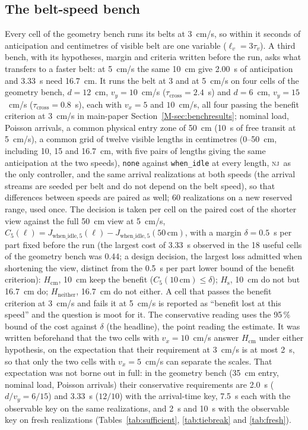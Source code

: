 \documentclass[11pt,a4paper]{article}
\newcommand{\nj}{\textsc{nj}}
\newcommand{\tcross}{\tau_{\mathrm{cross}}}
\newcommand{\tv}{\tau_{v}}
\newcommand{\lv}{\ell_{v}}
\begin{document}
\subsection{The belt-speed bench}\label{sup:beltdesign}
Every cell of the geometry bench runs its belts at 3~cm/s, so within it seconds of
anticipation and centimetres of visible belt are one variable ($\lv=3\tv$). A third
bench, with its hypotheses, margin and criteria written before the run, asks what
transfers to a faster belt: at 5~cm/s the same 10~cm give 2.00~s of anticipation and
3.33~s need 16.7~cm. It runs the belt at 3 and at 5~cm/s on four cells of the geometry
bench, $d=12$~cm, $v_y=10$~cm/s ($\tcross=2.4$~s) and $d=6$~cm, $v_y=15$~cm/s
($\tcross=0.8$~s), each with $v_x=5$ and $10$~cm/s, all four passing the benefit
criterion at 3~cm/s in main-paper Section~\ref{M-sec:benchresults}; nominal load, Poisson arrivals,
a common physical entry zone of 50~cm (10~s of free transit at 5~cm/s), a common grid of
twelve visible lengths in centimetres (0--50~cm, including 10, 15 and 16.7~cm, with
five pairs of lengths giving the same anticipation at the two speeds), \texttt{none}
against \texttt{when\_idle} at every length, \nj\ as the only controller, and the same
arrival realizations at both speeds (the arrival streams are seeded per belt and do not
depend on the belt speed), so that differences between speeds are paired as well; 60
realizations on a new reserved range, used once. The decision is taken per cell on the
paired cost of the shorter view against the full 50~cm view at 5~cm/s,
$C_5(\ell)=J_{\mathrm{when\_idle},5}(\ell)-J_{\mathrm{when\_idle},5}(50\,\mathrm{cm})$,
with a margin $\delta=0.5$~s per part fixed before the run (the largest cost of 3.33~s
observed in the 18 useful cells of the geometry bench was 0.44; a design decision, the
largest loss admitted when shortening the view, distinct from the 0.5~s per part lower
bound of the benefit criterion): $H_{\mathrm{cm}}$, 10~cm
keep the benefit ($C_5(10\,\mathrm{cm})\le\delta$); $H_{\mathrm{s}}$, 10~cm do not but
16.7~cm do; $H_{\mathrm{neither}}$, 16.7~cm do not either. A cell that passes the
benefit criterion at 3~cm/s and fails it at 5~cm/s is reported as ``benefit lost at this
speed'' and the question is moot for it. The conservative reading uses the 95\,\% bound
of the cost against $\delta$ (the headline), the point reading the estimate. It was
written beforehand that the two cells with $v_x=10$~cm/s answer $H_{\mathrm{cm}}$
under either hypothesis, on the expectation that their requirement at 3~cm/s is at most
2~s, so that only the two cells with $v_x=5$~cm/s can separate the scales. That expectation
was not borne out in full: in the geometry bench (35~cm entry, nominal load, Poisson
arrivals) their conservative requirements are 2.0~s ($d/v_y=6/15$) and 3.33~s ($12/10$)
with the arrival-time key, 7.5~s each with the observable key on the same realizations,
and 2~s and 10~s with the observable key on fresh realizations (Tables~\ref{tab:sufficient},
\ref{tab:tiebreak} and \ref{tab:fresh}).
\end{document}
